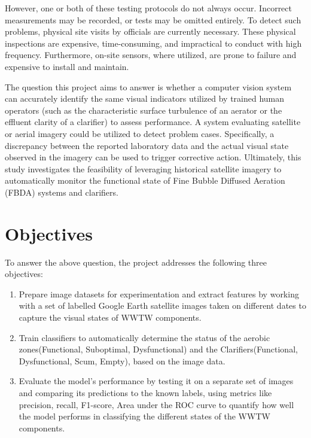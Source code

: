 However, one or both of these testing protocols do not always occur. Incorrect measurements may be recorded, or tests may be omitted entirely. To detect such problems, physical site visits by officials are currently necessary. These physical inspections are expensive, time-consuming, and impractical to conduct with high frequency. Furthermore, on-site sensors, where utilized, are prone to failure and expensive to install and maintain.

The question this project aims to answer is whether a computer vision system can accurately identify the same visual indicators utilized by trained human operators (such as the characteristic surface turbulence of an aerator or the effluent clarity of a clarifier) to assess performance. A system evaluating satellite or aerial imagery could be utilized to detect problem cases. Specifically, a discrepancy between the reported laboratory data and the actual visual state observed in the imagery can be used to trigger corrective action. Ultimately, this study investigates the feasibility of leveraging historical satellite imagery to automatically monitor the functional state of Fine Bubble Diffused Aeration (FBDA) systems and clarifiers.


\section{Objectives}
To answer the above question, the project addresses the following three objectives:

\begin{enumerate}
    \item Prepare image datasets for experimentation and extract features by working with a set of labelled Google Earth satellite images taken on different dates to capture the visual states of WWTW components.
    \item Train classifiers to automatically determine the status of the aerobic zones(Functional, Suboptimal, Dysfunctional) and the Clarifiers(Functional, Dysfunctional, Scum, Empty), based on the image data.
    \item Evaluate the model's performance by testing it on a separate set of images and comparing its predictions to the known labels, using metrics like precision, recall, F1-score, Area under the ROC curve to quantify how well the model performs in classifying the different states of the WWTW components.
\end{enumerate}